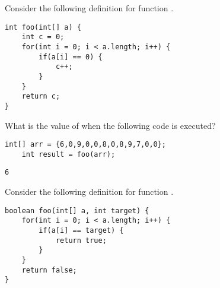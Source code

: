 \begin{questions}
\question Consider the following definition for function .

\begin{lstlisting}[basicstyle=\large]
int foo(int[] a) {
	int c = 0;
	for(int i = 0; i < a.length; i++) {
		if(a[i] == 0) {
			c++;
		}
	}
	return c;	
}
\end{lstlisting}

What is the value of  when the following code is executed?

\begin{lstlisting}[basicstyle=\large]
	int[] arr = {6,0,9,0,0,8,0,8,9,7,0,0};
	int result = foo(arr);
\end{lstlisting}

\begin{solution}
\begin{lstlisting}
6	
\end{lstlisting}	
\end{solution}
\question Consider the following definition for function .

\begin{lstlisting}[basicstyle=\large]
boolean foo(int[] a, int target) {
	for(int i = 0; i < a.length; i++) {
		if(a[i] == target) {
			return true;
		}
	}
	return false;	
}
\end{lstlisting}



\end{questions}
